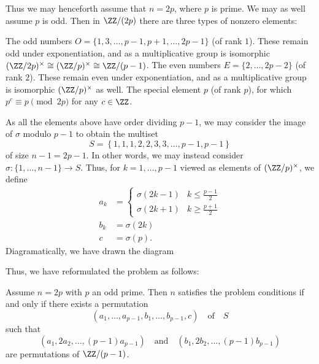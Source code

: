Thus we may henceforth assume that $n = 2p$, where $p$ is prime.
We may as well assume $p$ is odd.
Then in $\ZZ/(2p)$ there are three types of nonzero elements:
\begin{itemize}
	\ii The odd numbers
	$O = \{1, 3, \dots, p-1, p+1, \dots, 2p-1\}$
	(of rank $1$).
	These remain odd under exponentiation,
	and as a multiplicative group is
	isomorphic $(\ZZ/2p)^\times \cong (\ZZ/p)^\times \cong \ZZ/(p-1)$.
	\ii The even numbers
	$E = \{2, \dots, 2p-2 \}$
	(of rank $2$).
	These remain even under exponentiation,
	and as a multiplicative group is isomorphic
	$(\ZZ/p)^\times$ as well.
	\ii The special element $p$ (of rank $p$),
	for which $p^c \equiv p \pmod{2p}$ for any $c \in \ZZ$.
\end{itemize}
As all the elements above have order dividing $p-1$,
we may consider the image of $\sigma$ modulo $p-1$
to obtain the multiset
\[ S = \left\{ 1,1,1,2,2,3,3,\dots,p-1,p-1 \right\} \]
of size $n-1 = 2p-1$.
In other words, we may instead consider
$\sigma : \{1, \dots, n-1\} \to S$.
Thus, for $k = 1, \dots, p-1$ viewed as elements of $(\ZZ/p)^\times$,
we define
\begin{align*}
	a_k &= \begin{cases}
		\sigma(2k-1) & k \le \frac{p-1}{2} \\
		\sigma(2k+1) & k \ge \frac{p+1}{2}
	\end{cases} \\
	b_k &= \sigma(2k) \\
	c &= \sigma(p).
\end{align*}
Diagramatically, we have drawn the diagram
\begin{center}
\end{center}
Thus, we have reformulated the problem as follows:
\begin{proposition}
	Assume $n = 2p$ with $p$ an odd prime.
	Then $n$ satisfies the problem conditions
	if and only if there exists a permutation
	\[ (a_1, \dots, a_{p-1}, b_1, \dots, b_{p-1}, c)
		\quad\text{of}\quad S \]
	such that
	\[ (a_1, 2a_2, \dots, (p-1)a_{p-1})
		\quad\text{and}\quad (b_1, 2b_2, \dots, (p-1)b_{p-1}) \]
	are permutations of $\ZZ/(p-1)$.
\end{proposition}

